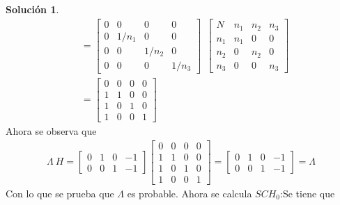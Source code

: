 \documentclass[12pt]{article}
\theoremstyle{plain}
\theoremstyle{definition}
\theoremstyle{definition}
\theoremstyle{definition}
\newtheorem*{solution}{Solución}
\begin{document}
\begin{solution}
\begin{align*}
&= \begin{bmatrix}
0 & 0 & 0 & 0        \\
0 & 1/n_1 & 0 & 0 \\
0 & 0 & 1/n_2 & 0 \\
0 & 0 & 0 & 1/n_3 
\end{bmatrix} \: \: \begin{bmatrix}
N   & n_1 & n_2 & n_3 \\
n_1 & n_1 & 0   & 0   \\
n_2 & 0   & n_2 & 0   \\
n_3 & 0   & 0   & n_3
\end{bmatrix}\\
&=\begin{bmatrix}0&0&0&0\\
1&1&0&0\\
1&0&1&0\\
1&0&0&1
\end{bmatrix}
\end{align*}
Ahora se observa que
\begin{align*}
\Lambda \ H =
\begin{bmatrix}
0&1&0&-1\\
0&0&1&-1
\end{bmatrix}\begin{bmatrix}0&0&0&0\\
1&1&0&0\\
1&0&1&0\\
1&0&0&1
\end{bmatrix}
=\begin{bmatrix}
0&1&0&-1\\
0&0&1&-1
\end{bmatrix} = \Lambda
\end{align*}
Con lo que se prueba que $\Lambda$ es probable. Ahora se calcula $SCH_0$:Se tiene que 


\end{solution}
\end{document}
